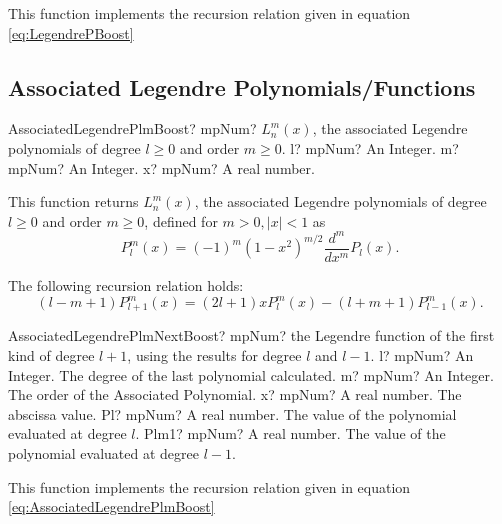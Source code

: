 \vspace{0.3cm}
This function implements the recursion relation given in equation \ref{eq:LegendrePBoost}




\subsection{Associated Legendre Polynomials/Functions}

\begin{mpFunctionsExtract}
	\mpFunctionThree
	{AssociatedLegendrePlmBoost? mpNum? $L^m_n (x)$, the associated Legendre polynomials of degree $l \geq 0$ and order $m \geq 0$.}
	{l? mpNum? An Integer.}
	{m? mpNum? An Integer.}
	{x? mpNum? A real number.}
\end{mpFunctionsExtract}

\vspace{0.3cm}
This function returns $L^m_n (x)$, the associated Legendre polynomials of degree $l \geq 0$ and order $m \geq 0$, defined for $m>0, |x|<1$ as
\begin{equation}
	P^m_l (x) = (-1)^m (1-x^2)^{m/2} \frac{d^m}{dx^m} P_{l} (x).
\end{equation}

The following recursion relation holds:
\begin{equation} \label{eq:AssociatedLegendrePlmBoost}
	(l-m+1)P^m_{l+1} (x) =  (2l+1) x P^m_{l}(x) - (l+m+1) P^m_{l-1}(x). 
\end{equation}



\vspace{0.6cm}
\begin{mpFunctionsExtract}
	\mpFunctionFive
	{AssociatedLegendrePlmNextBoost? mpNum? the Legendre function of the first kind of degree $l+1$, using the results for degree $l$ and $l-1$.}
	{l? mpNum? An Integer. The degree of the last polynomial calculated.}
	{m? mpNum? An Integer. The order of the Associated Polynomial.}
	{x? mpNum? A real number. The abscissa value.}
	{Pl? mpNum? A real number. The value of the polynomial evaluated at degree $l$.}
	{Plm1? mpNum? A real number. The value of the polynomial evaluated at degree $l-1$.}
\end{mpFunctionsExtract}

\vspace{0.3cm}
This function implements the recursion relation given in equation \ref{eq:AssociatedLegendrePlmBoost}



